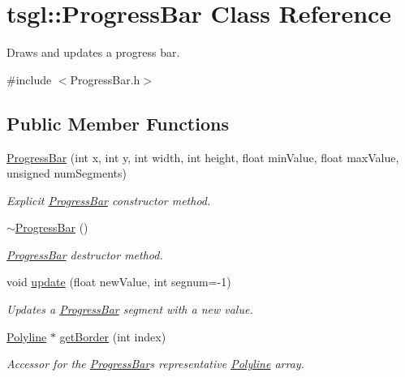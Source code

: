 \hypertarget{classtsgl_1_1_progress_bar}{}\section{tsgl\+:\+:Progress\+Bar Class Reference}
\label{classtsgl_1_1_progress_bar}


Draws and updates a progress bar.  




{\ttfamily \#include $<$Progress\+Bar.\+h$>$}

\subsection*{Public Member Functions}
\begin{DoxyCompactItemize}
\item 
\hyperlink{classtsgl_1_1_progress_bar_ac79018d09a75c490de3490306146c010}{Progress\+Bar} (int x, int y, int width, int height, float min\+Value, float max\+Value, unsigned num\+Segments)
\begin{DoxyCompactList}\small\item\em Explicit \hyperlink{classtsgl_1_1_progress_bar}{Progress\+Bar} constructor method. \end{DoxyCompactList}\item 
\hyperlink{classtsgl_1_1_progress_bar_aa3ad600db2cbd0e8f9221c264535df21}{$\sim$\+Progress\+Bar} ()
\begin{DoxyCompactList}\small\item\em \hyperlink{classtsgl_1_1_progress_bar}{Progress\+Bar} destructor method. \end{DoxyCompactList}\item 
void \hyperlink{classtsgl_1_1_progress_bar_a4274998e4935f33eb9212b2174d9c0c5}{update} (float new\+Value, int segnum=-\/1)
\begin{DoxyCompactList}\small\item\em Updates a \hyperlink{classtsgl_1_1_progress_bar}{Progress\+Bar} segment with a new value. \end{DoxyCompactList}\item 
\hyperlink{classtsgl_1_1_polyline}{Polyline} $\ast$ \hyperlink{classtsgl_1_1_progress_bar_ac2b51bdb0d19afaa03d60a9928fc873f}{get\+Border} (int index)
\begin{DoxyCompactList}\small\item\em Accessor for the \hyperlink{classtsgl_1_1_progress_bar}{Progress\+Bar}\textquotesingle{}s representative \hyperlink{classtsgl_1_1_polyline}{Polyline} array. \end{DoxyCompactList}\item 

\end{DoxyCompactItemize}
